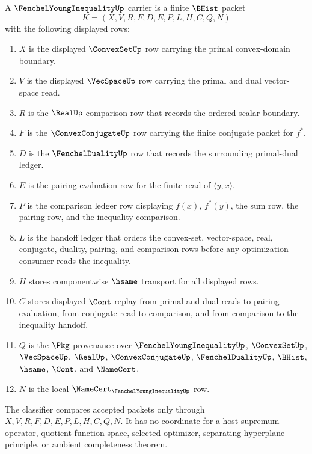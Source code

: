 \begin{definition}\label{def:fenchel-young-inequality-carrier}
A $\FenchelYoungInequalityUp$ carrier is a finite $\BHist$ packet
$$
K=(X,V,R,F,D,E,P,L,H,C,Q,N)
$$
with the following displayed rows:
\begin{enumerate}
\item $X$ is the displayed $\ConvexSetUp$ row carrying the primal convex-domain boundary.
\item $V$ is the displayed $\VecSpaceUp$ row carrying the primal and dual vector-space read.
\item $R$ is the $\RealUp$ comparison row that records the ordered scalar boundary.
\item $F$ is the $\ConvexConjugateUp$ row carrying the finite conjugate packet for $f^\ast$.
\item $D$ is the $\FenchelDualityUp$ row that records the surrounding primal-dual ledger.
\item $E$ is the pairing-evaluation row for the finite read of $\langle y,x\rangle$.
\item $P$ is the comparison ledger row displaying $f(x)$, $f^\ast(y)$, the sum row, the pairing row, and the inequality comparison.
\item $L$ is the handoff ledger that orders the convex-set, vector-space, real, conjugate, duality, pairing, and comparison rows before any optimization consumer reads the inequality.
\item $H$ stores componentwise $\hsame$ transport for all displayed rows.
\item $C$ stores displayed $\Cont$ replay from primal and dual reads to pairing evaluation, from conjugate read to comparison, and from comparison to the inequality handoff.
\item $Q$ is the $\Pkg$ provenance over $\FenchelYoungInequalityUp$, $\ConvexSetUp$, $\VecSpaceUp$, $\RealUp$, $\ConvexConjugateUp$, $\FenchelDualityUp$, $\BHist$, $\hsame$, $\Cont$, and $\NameCert$.
\item $N$ is the local $\NameCert_{\FenchelYoungInequalityUp}$ row.
\end{enumerate}
The classifier compares accepted packets only through $X,V,R,F,D,E,P,L,H,C,Q,N$. It has no coordinate for a host supremum operator, quotient function space, selected optimizer, separating hyperplane principle, or ambient completeness theorem.
\end{definition}

